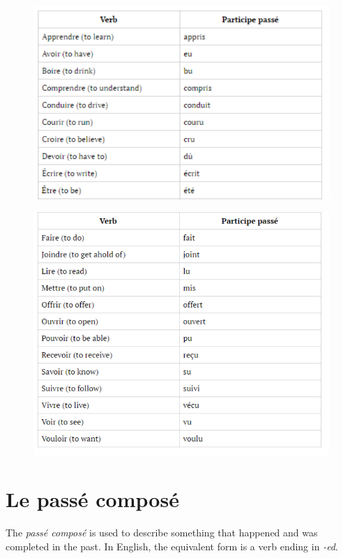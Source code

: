 \documentclass[11pt, oneside]{book}
\begin{document}
{	\begin{figure}[H]
	\includegraphics[scale=0.75]{charts/participePasseIrregular.png}
	\end{figure}
	
	\begin{figure}[H]
	\includegraphics[scale=0.565]{charts/participePasseIrregular2.png}
	\end{figure}
	
\section{Le pass\'e compos\'e}

The \textit{pass\'e compos\'e} is used to describe something that happened and was completed in the past. In English, the equivalent form is a verb ending in \textit{-ed}. \vspace{0.5\baselineskip}

}
\end{document}
